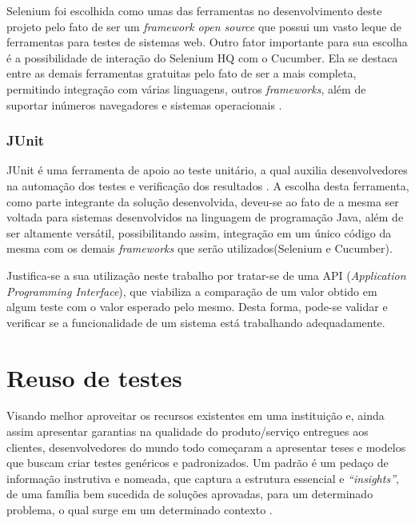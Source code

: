 \documentclass[tg]{mdtufsm}
\begin{document}
Selenium foi escolhida como umas das ferramentas no desenvolvimento deste projeto pelo fato de ser um \emph{framework open source} que possui um vasto leque de ferramentas para testes de sistemas web. Outro fator
importante para sua escolha é a possibilidade de interação do Selenium HQ com o Cucumber. Ela se destaca entre as demais ferramentas gratuitas pelo fato de ser a mais completa, permitindo integração com
várias linguagens, outros \emph{frameworks}, além de suportar inúmeros navegadores e sistemas operacionais \cite{pereiraestudoselenium}.

\subsubsection{JUnit}
JUnit é uma ferramenta de apoio ao teste unitário, a qual auxilia desenvolvedores na automação dos testes e verificação dos resultados \cite{biasi2006geraccao}. A escolha desta ferramenta, como parte integrante da solução desenvolvida, deveu-se ao fato de a mesma ser voltada para sistemas desenvolvidos na linguagem de programação Java, além de ser altamente versátil, possibilitando assim, integração em um único código da mesma com os demais \emph{frameworks} que serão utilizados(Selenium e Cucumber).

Justifica-se a sua utilização neste trabalho por tratar-se de uma API (\emph{Application Programming Interface}), que viabiliza a comparação de um valor obtido em algum teste com o valor esperado pelo mesmo. Desta forma, pode-se validar e verificar se
a funcionalidade de um sistema está trabalhando adequadamente.


\section{Reuso de testes}

Visando melhor aproveitar os recursos existentes em uma instituição e, ainda assim apresentar garantias na qualidade do produto/serviço entregues aos clientes, desenvolvedores do mundo todo começaram a apresentar
teses e modelos que buscam criar testes genéricos e padronizados. Um padrão é um pedaço de informação instrutiva e nomeada, que captura a estrutura essencial
e \emph{“insights”}, de uma família bem sucedida de soluções aprovadas, para um determinado problema, o qual surge em um determinado contexto \cite{cagnin2004reuso}.
\end{document}
